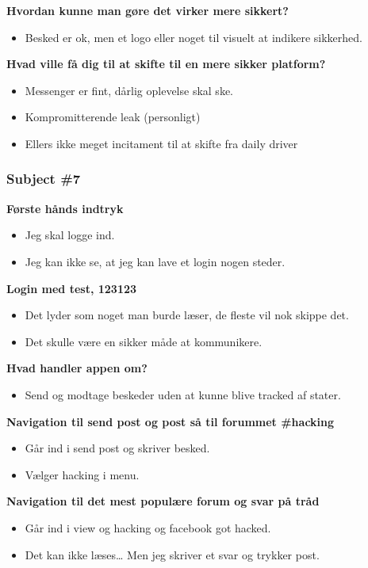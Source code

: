 \noindent\textbf{Hvordan kunne man gøre det virker mere sikkert?}
\begin{itemize}
    \item Besked er ok, men et logo eller noget til visuelt at indikere sikkerhed.
\end{itemize}

\noindent\textbf{Hvad ville få dig til at skifte til en mere sikker platform?}
\begin{itemize}
    \item Messenger er fint, dårlig oplevelse skal ske.
    \item Kompromitterende leak (personligt)
    \item Ellers ikke meget incitament til at skifte fra daily driver
\end{itemize}

\subsubsection{Subject \#7}

\noindent\textbf{Første hånds indtryk}
\begin{itemize}
    \item Jeg skal logge ind.
    \item Jeg kan ikke se, at jeg kan lave et login nogen steder.
\end{itemize}

\noindent\textbf{Login med test, 123123}
\begin{itemize}
    \item Det lyder som noget man burde læser, de fleste vil nok skippe det.
    \item Det skulle være en sikker måde at kommunikere.
\end{itemize}

\noindent\textbf{Hvad handler appen om?}
\begin{itemize}
    \item Send og modtage beskeder uden at kunne blive tracked af stater.
\end{itemize}

\noindent\textbf{Navigation til send post og post så til forummet \#hacking}
\begin{itemize}
    \item Går ind i send post og skriver besked.
    \item Vælger hacking i menu.
\end{itemize}

\noindent\textbf{Navigation til det mest populære forum og svar på tråd}
\begin{itemize}
    \item Går ind i view og hacking og facebook got hacked.
    \item Det kan ikke læses… Men jeg skriver et svar og trykker post.
\end{itemize}


